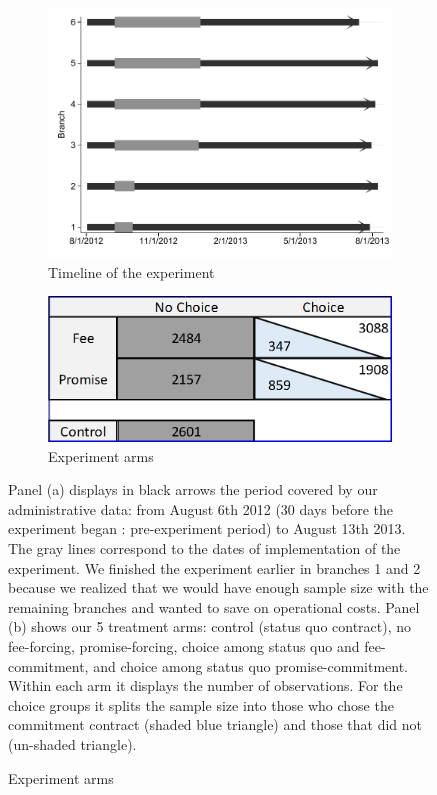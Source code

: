 \documentclass[oneside,11pt]{article}
\begin{document}
\begin{figure}[H]
     \caption{Experiment description}
    \label{exp_description}
    \begin{center}
    \begin{subfigure}{.40\textwidth}
      \caption{Timeline of the experiment}
        \centering
        \includegraphics[width=\textwidth]{Figuras/timeline_suc_exp_extended.pdf}
    \end{subfigure}
    \begin{subfigure}{0.40\textwidth}
    \caption{Experiment arms}
       \centering
      \includegraphics[width=\textwidth]{Figuras/exp_arms.PNG}
    \end{subfigure}
    \end{center}
         \scriptsize Panel (a) displays in black arrows the period covered by our administrative data: from August 6th 2012 (30 days before the experiment began : pre-experiment period) to August 13th 2013. The gray lines correspond to the dates of implementation of the experiment. We finished the experiment earlier in branches 1 and 2 because we realized that we would have enough sample size with the remaining branches and wanted to save on operational costs. Panel (b) shows our 5 treatment arms: control (status quo contract), no fee-forcing, promise-forcing, choice among status quo and fee-commitment, and choice among status quo promise-commitment. Within each arm it displays the number of observations. For the choice groups it splits the sample size into those who chose the commitment contract (shaded blue triangle) and those that did not (un-shaded triangle).
\end{figure}
\end{document}
